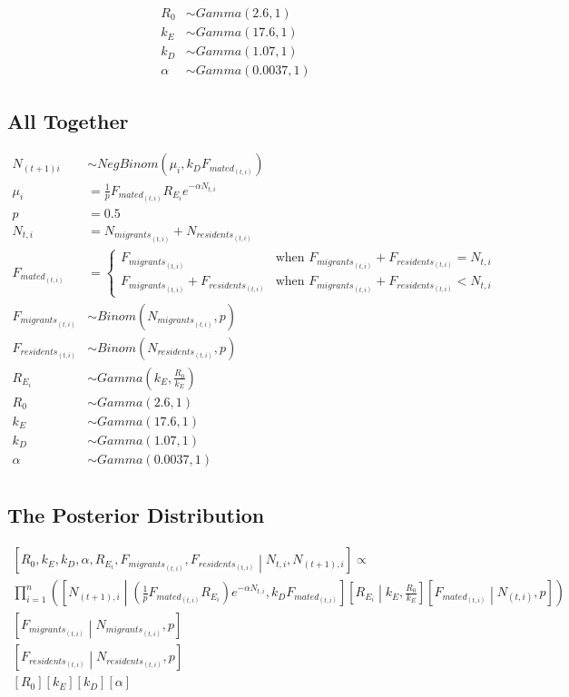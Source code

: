 \documentclass{article}[12pt]
\begin{document}
\begin{align*}
R_0 & \sim  Gamma(2.6, 1) \\
k_E & \sim Gamma(17.6, 1) \\
k_D & \sim Gamma(1.07, 1) \\
\alpha & \sim Gamma(0.0037, 1)
\end{align*}

\subsection*{All Together}

\begin{align*}
N_{(t+1)i} & \sim NegBinom(\mu_i, k_DF_{{mated}_{(t, i)}}) \\
\mu_i & = \frac{1}{p}F_{{mated}_{(t, i)}}R_{E_i} e^{-\alpha N_{t, i}} \\
p & = 0.5 \\
N_{t, i} & = N_{{migrants}_{(t, i)}} + N_{{residents}_{(t, i)}} \\
F_{{mated}_{(t, i)}} & = \begin{cases}
	F_{{migrants}_{(t, i)}} & \text{when } F_{{migrants}_{(t, i)}} + F_{{residents}_{(t, i)}} = N_{t, i}  \\
	F_{{migrants}_{(t, i)}} + F_{{residents}_{(t, i)}} & \text{when } F_{{migrants}_{(t, i)}} + F_{{residents}_{(t, i)}} < N_{t, i}
	\end{cases} \\
F_{{migrants}_{(t, i)}} & \sim Binom(N_{{migrants}_{(t, i)}}, p) \\
F_{{residents}_{(t,i )}} & \sim Binom(N_{{residents}_{(t, i)}}, p) \\
R_{E_i} & \sim Gamma(k_E, \frac{R_0}{k_E}) \\
R_0 & \sim  Gamma(2.6, 1) \\
k_E & \sim Gamma(17.6, 1) \\
k_D & \sim Gamma(1.07, 1) \\
\alpha & \sim Gamma(0.0037, 1) \\
\end{align*}





\subsection*{The Posterior Distribution}
\begin{multline*}
\left[R_0, k_E, k_D, \alpha , R_{E_i}, F_{{migrants}_{(t, i)}}, F_{{residents}_{(t, i)}} \middle | N_{t, i}, N_{(t + 1), i} \right] \propto \\
 \prod_{i=1}^{n}\left( \left[N_{(t+1), i} \middle | \left(\frac{1}{p}F_{{mated}_{(t, i)}}R_{E_i} \right)e^{-\alpha N_{t, i}}, k_DF_{{mated}_{(t, i)}} \right] \left[ R_{E_i} \middle | k_{E}, \frac{R_{0}}{k_E} \right]   \left[F_{{mated}_{(t, i)}} \middle | N_{(t, i)},p \right] \right) \\
\left[F_{{migrants}_{(t, i)}} \middle | N_{{migrants}_{(t, i)}},p \right] \\
\left[F_{{residents}_{(t, i)}} \middle | N_{{residents}_{(t, i)}},p \right] \\
[R_0][k_E][k_D][\alpha]
\end{multline*}
\end{document}
